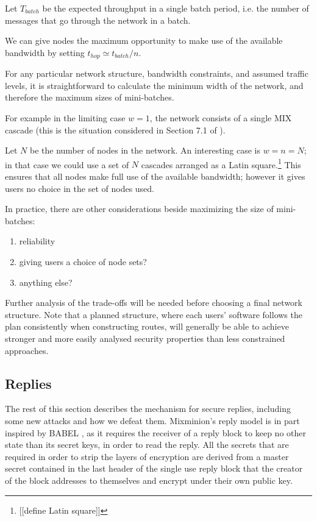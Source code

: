 \documentclass{llncs}
\begin{document}
Let $T_{batch}$ be the expected throughput in a single batch period,
i.e. the number of messages that go through the network in a batch.

We can give nodes the maximum opportunity to make use of the available
bandwidth by setting $t_{hop} \simeq t_{batch}/n$.


For any particular network structure, bandwidth constraints, and
assumed traffic levels, it is straightforward to calculate the
minimum width of the network, and therefore the maximum sizes of
mini-batches.

For example in the limiting case $w = 1$, the network consists of a
single MIX cascade (this is the situation considered in Section 7.1
of \cite{babel}).

Let $N$ be the number of nodes in the network. An interesting case
is $w = n = N$; in that case we could use a set of $N$ cascades
arranged as a Latin square.\footnote{[[define Latin square]]}
This ensures that all nodes make full use of the available bandwidth;
however it gives users no choice in the set of nodes used.

In practice, there are other considerations beside maximizing the
size of mini-batches:

\begin{enumerate}
\item reliability
\item giving users a choice of node sets?
\item anything else?
\end{enumerate}

Further analysis of the trade-offs will be needed before choosing a
final network structure. Note that a planned structure, where each
users' software follows the plan consistently when constructing
routes, will generally be able to achieve stronger and more easily
analysed security properties than less constrained approaches.

\subsection{Replies}
\label{subsec:replies}

The rest of this section describes the mechanism for secure replies,
including some new attacks and how we defeat them. Mixminion's reply
model is in part inspired by BABEL \cite{babel}, as it requires the
receiver of a reply block to keep no other state than its secret keys,
in order to read the reply.  All the secrets that are required in
order to strip the layers of encryption are derived from a master
secret contained in the last header of the single use reply block that
the creator of the block addresses to themselves and encrypt under
their own public key.
\end{document}
